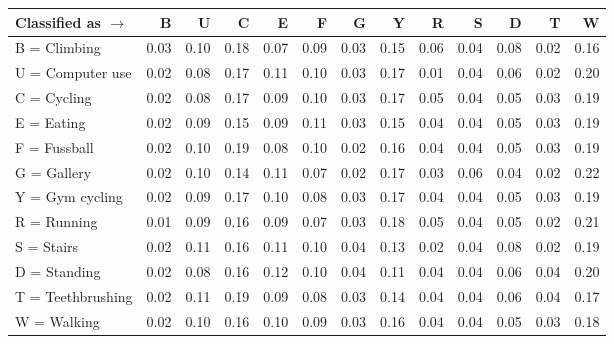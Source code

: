 \begin{tabular}{lrrrrrrrrrrrr}
\toprule
Classified as $\rightarrow$ &    B &    U &    C &    E &    F &    G &    Y &    R &    S &    D &    T &    W \\
\midrule
B = Climbing      & 0.03 & 0.10 & 0.18 & 0.07 & 0.09 & 0.03 & 0.15 & 0.06 & 0.04 & 0.08 & 0.02 & 0.16 \\
U = Computer use  & 0.02 & 0.08 & 0.17 & 0.11 & 0.10 & 0.03 & 0.17 & 0.01 & 0.04 & 0.06 & 0.02 & 0.20 \\
C = Cycling       & 0.02 & 0.08 & 0.17 & 0.09 & 0.10 & 0.03 & 0.17 & 0.05 & 0.04 & 0.05 & 0.03 & 0.19 \\
E = Eating        & 0.02 & 0.09 & 0.15 & 0.09 & 0.11 & 0.03 & 0.15 & 0.04 & 0.04 & 0.05 & 0.03 & 0.19 \\
F = Fussball      & 0.02 & 0.10 & 0.19 & 0.08 & 0.10 & 0.02 & 0.16 & 0.04 & 0.04 & 0.05 & 0.03 & 0.19 \\
G = Gallery       & 0.02 & 0.10 & 0.14 & 0.11 & 0.07 & 0.02 & 0.17 & 0.03 & 0.06 & 0.04 & 0.02 & 0.22 \\
Y = Gym cycling   & 0.02 & 0.09 & 0.17 & 0.10 & 0.08 & 0.03 & 0.17 & 0.04 & 0.04 & 0.05 & 0.03 & 0.19 \\
R = Running       & 0.01 & 0.09 & 0.16 & 0.09 & 0.07 & 0.03 & 0.18 & 0.05 & 0.04 & 0.05 & 0.02 & 0.21 \\
S = Stairs        & 0.02 & 0.11 & 0.16 & 0.11 & 0.10 & 0.04 & 0.13 & 0.02 & 0.04 & 0.08 & 0.02 & 0.19 \\
D = Standing      & 0.02 & 0.08 & 0.16 & 0.12 & 0.10 & 0.04 & 0.11 & 0.04 & 0.04 & 0.06 & 0.04 & 0.20 \\
T = Teethbrushing & 0.02 & 0.11 & 0.19 & 0.09 & 0.08 & 0.03 & 0.14 & 0.04 & 0.04 & 0.06 & 0.04 & 0.17 \\
W = Walking       & 0.02 & 0.10 & 0.16 & 0.10 & 0.09 & 0.03 & 0.16 & 0.04 & 0.04 & 0.05 & 0.03 & 0.18 \\
\bottomrule
\end{tabular}
